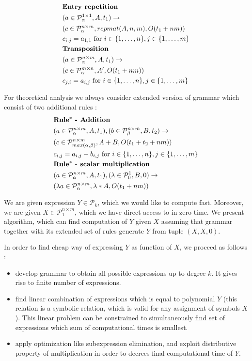 \documentclass{article}
\begin{document}
\begin{align*}
&\text{{\bf Entry repetition}}\\
&(a \in \mathcal{P}^{1 \times 1}_\alpha, A, t_1) \rightarrow \\ 
&(c \in \mathcal{P}^{n \times m}_\alpha, repmat(A, n, m), O(t_1 + nm)) \\
&c_{i, j} = a_{1, 1} \text{ for } i \in \{1, \dots, n\}, j \in \{1, \dots, m\}\\
&\text{{\bf Transposition}}\\
&(a \in \mathcal{P}^{n \times m}_\alpha, A, t_1) \rightarrow \\ 
&(c \in \mathcal{P}^{m \times n}_\alpha, A', O(t_1 + nm)) \\
&c_{j, i} = a_{i, j} \text{ for } i \in \{1, \dots, n\}, j \in \{1, \dots, m\} \\
\end{align*}

For theoretical analysis we always consider extended version of grammar which consist of two additional rules : 
\begin{align*}
&\text{{\bf Rule$^*$ - Addition}}\\
&(a \in \mathcal{P}^{n \times m}_\alpha, A, t_1), (b \in \mathcal{P}^{n \times m}_\beta, B, t_2) \rightarrow \\ 
&(c \in \mathcal{P}^{n \times m}_{max(\alpha, \beta)}, A + B, O(t_1 + t_2 + nm)) \\
&c_{i,j} = a_{i,j} + b_{i, j} \text{ for } i \in \{1, \dots, n\}, j \in \{1, \dots, m\} \\
&\text{{\bf Rule$^*$ - scalar multiplication}}\\
&(a \in \mathcal{P}^{n \times m}_\alpha, A, t_1), (\lambda \in \mathcal{P}^{1}_0, B, 0) \rightarrow \\ 
&(\lambda a \in \mathcal{P}^{n \times m}_{\alpha}, \lambda * A, O(t_1 + nm)) \\
\end{align*}

We are given expression $Y \in \mathcal{P}_k$, which we would like to compute
fast. Moreover, we are given $X \in \mathcal{P}^{n \times m}_1$, which we have
direct access to in zero time. We present algorithm, which can find computation
of $Y$ given $X$ assuming that grammar together with its extended set of rules
generate $Y$ from tuple $(X, X, 0)$.

In order to find cheap way of expressing $Y$ as function of $X$, we proceed as follows : 
\begin{itemize}
\item develop grammar to obtain all possible expressions up to degree $k$. It gives rise to finite number of expressions.
\item find linear combination of expressions which is equal to polynomial $Y$ (this relation is a symbolic relation, which is valid for any assignment of symbols $X$). This linear problem can be constrained to simultaneously find set of expressions which sum of computational times is smallest.
\item apply optimization like subexpression elimination, and exploit distributive property of multiplication in order to decrees final computational time of $Y$.
\end{itemize}
\end{document}

